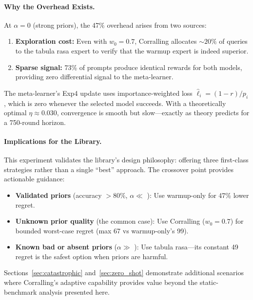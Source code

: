 \paragraph{Why the Overhead Exists.}
At $\alpha{=}0$ (strong priors), the 47\% overhead arises from two
sources:
\begin{enumerate}[nosep]
    \item \textbf{Exploration cost:} Even with $w_0{=}0.7$, Corralling
          allocates ${\sim}20\%$ of queries to the tabula rasa expert
          to verify that the warmup expert is indeed superior.
    \item \textbf{Sparse signal:} 73\% of prompts produce identical
          rewards for both models, providing zero differential signal
          to the meta-learner.
\end{enumerate}

The meta-learner's Exp4 update uses importance-weighted loss
$\hat\ell_i = (1{-}r)/p_i$, which is zero whenever the selected model
succeeds.  With a theoretically optimal $\eta{\approx}0.030$,
convergence is smooth but slow---exactly as theory predicts for a
750-round horizon.

\paragraph{Implications for the Library.}
This experiment validates the library's design philosophy: offering
three first-class strategies rather than a single ``best'' approach.
The crossover point provides actionable guidance:

\begin{itemize}[nosep]
    \item \textbf{Validated priors} (accuracy ${>}80\%$, $\alpha \ll$
          \CrossoverWC{}): Use warmup-only for 47\% lower regret.
    \item \textbf{Unknown prior quality} (the common case):
          Use Corralling ($w_0{=}0.7$) for bounded worst-case regret
          (max 67 vs warmup-only's 99).
    \item \textbf{Known bad or absent priors} ($\alpha \gg$
          \CrossoverWC{}): Use tabula rasa---its constant 49 regret
          is the safest option when priors are harmful.
\end{itemize}

Sections~\ref{sec:catastrophic} and~\ref{sec:zero_shot} demonstrate
additional scenarios where Corralling's adaptive capability provides
value beyond the static-benchmark analysis presented here.

